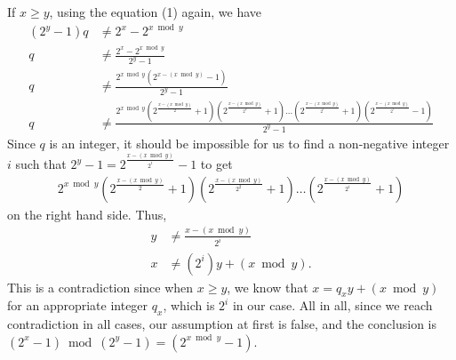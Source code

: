 \documentclass[11pt]{article}
\begin{document}
\noindent If $x \ge y$, using the equation (1) again, we have
\begin{align*}
    (2^y - 1)q &\neq 2^x - 2^{x \bmod y} \\
    q &\neq \frac{2^x - 2^{x \bmod y}}{2^y - 1} \\
    q &\neq \frac{2^{x \bmod y} (2^{x - (x \bmod y)} - 1)}{2^y - 1} \\
    q &\neq \frac{2^{x \bmod y} \left(2^\frac{x - (x \bmod y)}{2} + 1 \right)  \left(2^\frac{x - (x \bmod y)}{2^2} + 1 \right) \dots  \left(2^\frac{x - (x \bmod y)}{2^i} + 1 \right)  \left(2^\frac{x - (x \bmod y)}{2^i} - 1 \right)}{2^y - 1}
\end{align*}
Since $q$ is an integer, it should be impossible for us to find a non-negative integer $i$ such that $2^y - 1 = 2^\frac{x - (x \bmod y)}{2^i} - 1$ to get
\begin{align*}
    2^{x \bmod y} \left(2^\frac{x - (x \bmod y)}{2} + 1 \right)  \left(2^\frac{x - (x \bmod y)}{2^2} + 1 \right) \dots  \left(2^\frac{x - (x \bmod y)}{2^i} + 1 \right)
\end{align*}
on the right hand side. Thus,
\begin{align*}
    y &\neq \frac{x - (x \bmod y)}{2^i} \\
    x &\neq (2^i) y + (x \bmod y).
\end{align*}
This is a contradiction since when $x \ge y$, we know that $x = q_x y + (x \bmod y)$ for an appropriate integer $q_x$, which is $2^i$ in our case. All in all, since we reach contradiction in all cases, our assumption at first is false, and the conclusion is $(2^x - 1) \bmod (2^y - 1) = (2^{x \bmod y} - 1)$.
\end{document}

